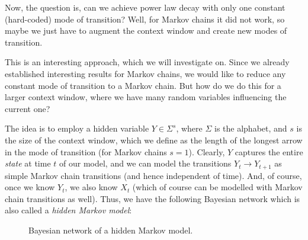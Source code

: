 \documentclass[../../main.tex]{subfiles}
\begin{document}
    Now, the question is, can we achieve power law decay with only one constant (hard-coded) mode of transition? Well, for Markov chains it did not work, so maybe we just have to augment the context window and create new modes of transition.

    This is an interesting approach, which we will investigate on. Since we already established interesting results for Markov chains, we would like to reduce any constant mode of transition to a Markov chain. But how do we do this for a larger context window, where we have many random variables influencing the current one?
    
    The idea is to employ a hidden variable $Y \in \Sigma ^s$, where $\Sigma$ is the alphabet, and $s$ is the size of the context window, which we define as the length of the longest arrow in the mode of transition (for Markov chains $s = 1$). Clearly, $Y$ captures the entire \emph{state} at time $t$ of our model, and we can model the transitions $Y_t \to Y_{t + 1}$ as simple Markov chain transitions (and hence independent of time). And, of course, once we know $Y_t$, we also know $X_t$ (which of course can be modelled with Markov chain transitions as well). Thus, we have the following Bayesian network which is also called a \emph{hidden Markov model}:

    \begin{figure}[h]
        \center
        \caption{Bayesian network of a hidden Markov model.}
        \label{fig:bayesian_network_hidden_markov}
    \end{figure}
\end{document}
